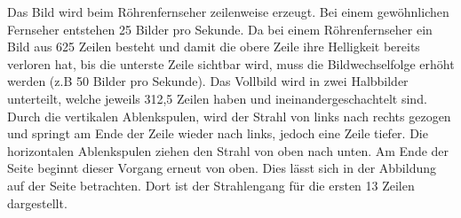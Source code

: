 Das Bild wird beim Röhrenfernseher zeilenweise erzeugt.
Bei einem gewöhnlichen Fernseher entstehen 25 Bilder pro Sekunde.
Da bei einem Röhrenfernseher ein Bild aus 625 Zeilen besteht und damit die obere Zeile ihre Helligkeit bereits verloren hat, bis die unterste Zeile sichtbar wird, muss die Bildwechselfolge erhöht werden (z.B 50 Bilder pro Sekunde).
Das Vollbild wird in zwei Halbbilder unterteilt, welche jeweils 312,5 Zeilen haben und ineinandergeschachtelt sind.
Durch die vertikalen Ablenkspulen, wird der Strahl von links nach rechts gezogen und springt am Ende der Zeile wieder nach links, jedoch eine Zeile tiefer.
Die horizontalen Ablenkspulen ziehen den Strahl von oben nach  unten.
Am Ende der Seite beginnt dieser Vorgang erneut von oben.
Dies lässt sich in der Abbildung auf der Seite \cite{Roehrenfernsehr} betrachten.
Dort ist der Strahlengang für die ersten 13 Zeilen dargestellt.

